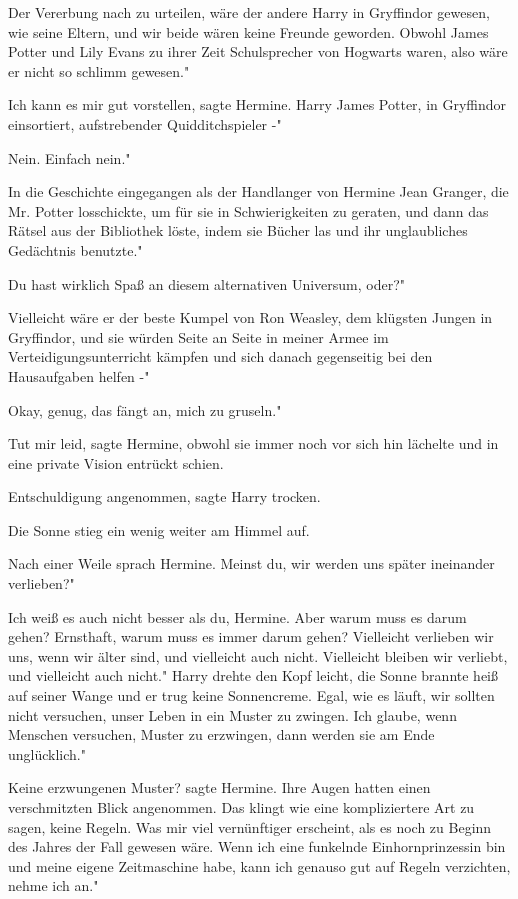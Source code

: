 \glqq{}Der Vererbung nach zu urteilen, wäre der andere Harry in Gryffindor
gewesen, wie seine Eltern, und wir beide wären keine Freunde geworden. Obwohl
James Potter und Lily Evans zu ihrer Zeit Schulsprecher von Hogwarts waren, also
wäre er nicht so schlimm gewesen."

\glqq{}Ich kann es mir gut vorstellen\grqq{}, sagte Hermine. \glqq{}Harry James
Potter, in Gryffindor einsortiert, aufstrebender Quidditchspieler -"

\glqq{}Nein. Einfach nein."

\glqq{}In die Geschichte eingegangen als der Handlanger von Hermine Jean Granger,
die Mr. Potter losschickte, um für sie in Schwierigkeiten zu geraten, und dann
das Rätsel aus der Bibliothek löste, indem sie Bücher las und ihr unglaubliches
Gedächtnis benutzte."

\glqq{}Du hast wirklich Spaß an diesem alternativen Universum, oder?"

\glqq{}Vielleicht wäre er der beste Kumpel von Ron Weasley, dem klügsten Jungen
in Gryffindor, und sie würden Seite an Seite in meiner Armee im
Verteidigungsunterricht kämpfen und sich danach gegenseitig bei den Hausaufgaben
helfen -"

\glqq{}Okay, genug, das fängt an, mich zu gruseln."

\glqq{}Tut mir leid\grqq{}, sagte Hermine, obwohl sie immer noch vor sich hin
lächelte und in eine private Vision entrückt schien.

\glqq{}Entschuldigung angenommen\grqq{}, sagte Harry trocken.

Die Sonne stieg ein wenig weiter am Himmel auf.

Nach einer Weile sprach Hermine. \glqq{}Meinst du, wir werden uns später
ineinander verlieben?"

\glqq{}Ich weiß es auch nicht besser als du, Hermine. Aber warum muss es darum
gehen? Ernsthaft, warum muss es immer darum gehen? Vielleicht verlieben wir uns,
wenn wir älter sind, und vielleicht auch nicht. Vielleicht bleiben wir verliebt,
und vielleicht auch nicht." Harry drehte den Kopf leicht, die Sonne brannte heiß
auf seiner Wange und er trug keine Sonnencreme. \glqq{}Egal, wie es läuft, wir
sollten nicht versuchen, unser Leben in ein Muster zu zwingen. Ich glaube, wenn
Menschen versuchen, Muster zu erzwingen, dann werden sie am Ende unglücklich."

\glqq{}Keine erzwungenen Muster?\grqq{} sagte Hermine. Ihre Augen hatten einen
verschmitzten Blick angenommen. \glqq{}Das klingt wie eine kompliziertere Art zu
sagen, keine Regeln. Was mir viel vernünftiger erscheint, als es noch zu Beginn
des Jahres der Fall gewesen wäre. Wenn ich eine funkelnde Einhornprinzessin bin
und meine eigene Zeitmaschine habe, kann ich genauso gut auf Regeln verzichten,
nehme ich an."

